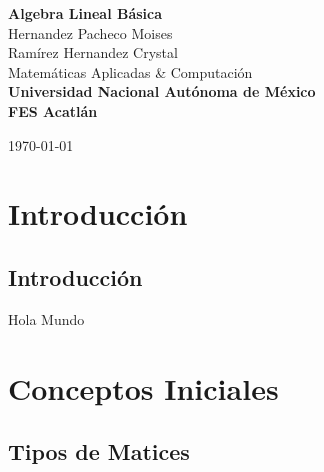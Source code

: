 \documentclass[a4paper,12pt]{report} %
\begin{document}
\begin{titlepage}
    \pagecolor{MidnightBlue}
    \color{white}
    \centering
    {\Huge \textbf{Algebra Lineal Básica}} \\[2.5cm] %
    {\Large Hernandez Pacheco Moises} \\[0.5cm]       %
    {\Large Ramírez Hernandez Crystal} \\[6cm]       %
    \color{SkyBlue}
    {\Large Matemáticas Aplicadas \& Computación} \\[1cm]
    \color{white}
    \textbf{\large Universidad Nacional Autónoma de México} \\[0.5cm]   %
    \textbf{\large FES Acatlán} \\[1cm]   %
    \vfill
    
    \vfill
    {\large \today}                              %
\end{titlepage}

\pagecolor{white}
\color{black}
\tableofcontents %

\newpage
\renewcommand{\thechapter}{\Roman{chapter}}
\part{Introducción}
\renewcommand{\thechapter}{\arabic{chapter}}
\chapter{Introducción}
Hola Mundo

\newpage
\renewcommand{\thechapter}{\Roman{chapter}}
\part{Conceptos Iniciales}
\renewcommand{\thechapter}{\arabic{chapter}}
\chapter{Tipos de Matices}
\lipsum[1-3] %
\end{document}
